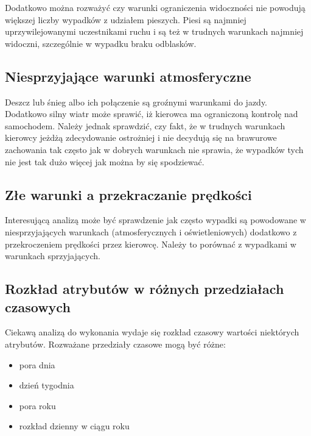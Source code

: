 Dodatkowo można rozważyć czy warunki ograniczenia widoczności nie
powodują większej liczby wypadków z udziałem pieszych. Piesi są najmniej
uprzywilejowanymi uczestnikami ruchu i są też w trudnych warunkach
najmniej widoczni, szczególnie w wypadku braku odblasków.

\subsection{Niesprzyjające warunki
atmosferyczne}\label{niesprzyjajace-warunki-atmosferyczne}

Deszcz lub śnieg albo ich połączenie są groźnymi warunkami do jazdy.
Dodatkowo silny wiatr może sprawić, iż kierowca ma ograniczoną kontrolę
nad samochodem. Należy jednak sprawdzić, czy fakt, że w trudnych
warunkach kierowcy jeżdżą zdecydowanie ostrożniej i nie decydują się na
brawurowe zachowania tak często jak w dobrych warunkach nie sprawia, że
wypadków tych nie jest tak dużo więcej jak można by się spodziewać.

\subsection{Złe warunki a przekraczanie
prędkości}\label{ze-warunki-a-przekraczanie-predkosci}

Interesującą analizą może być sprawdzenie jak często wypadki są
powodowane w niesprzyjających warunkach (atmosferycznych i
oświetleniowych) dodatkowo z przekroczeniem prędkości przez kierowcę.
Należy to porównać z wypadkami w warunkach sprzyjających.

\subsection{Rozkład atrybutów w różnych przedziałach
czasowych}\label{rozkad-atrybutow-w-roznych-przedziaach-czasowych}

Ciekawą analizą do wykonania wydaje się rozkład czasowy wartości
niektórych atrybutów. Rozważane przedziały czasowe mogą być różne:

\begin{itemize}
\itemsep-14pt\parskip0pt
\item
  pora dnia\\
\item
  dzień tygodnia\\
\item
  pora roku\\
\item
  rozkład dzienny w ciągu roku
\end{itemize}

